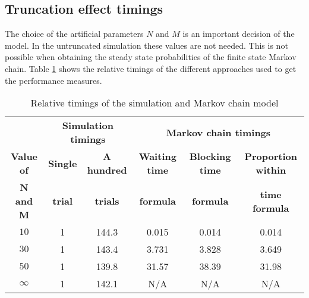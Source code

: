\subsection{Truncation effect timings} \label{sec:truncation_effect}

The choice of the artificial parameters \(N\) and \(M\) is an important 
decision of the model.
In the untruncated simulation these values are not needed.
This is not possible when obtaining the steady state probabilities of the
finite state Markov chain.
Table \ref{tab:truncation_effect_timings} shows the relative timings of the
different approaches used to get the performance measures.

\begin{table}[h]
    \centering
    \begin{tabular}{c|cc|ccc}
        & \multicolumn{2}{c}{\textbf{Simulation timings}} & 
        \multicolumn{3}{c}{\textbf{Markov chain timings}} \\
        \textbf{Value of} & \textbf{Single} & \textbf{A hundred} & 
        \textbf{Waiting time} & \textbf{Blocking time} & 
        \textbf{Proportion within} \\
        \textbf{N and M} & \textbf{trial} & \textbf{trials} & 
        \textbf{formula} & \textbf{formula} & \textbf{time formula} \\
        \hline
        \(10\) & 1 & 144.3 & 0.015 & 0.014 & 0.014 \\
        \hline
        \(30\) & 1 & 143.4 & 3.731 & 3.828 & 3.649 \\
        \hline
        \(50\) & 1 & 139.8 & 31.57 & 38.39 & 31.98 \\
        \hline
        \(\infty\) & 1 & 142.1 & N/A & N/A & N/A \\
    \end{tabular}
    \caption{Relative timings of the simulation and Markov chain model}
    \label{tab:truncation_effect_timings}
\end{table}
